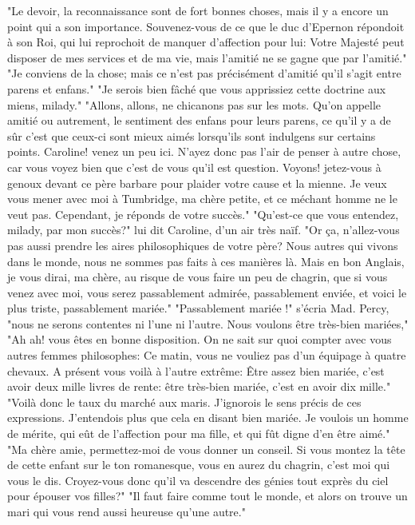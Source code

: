 "Le devoir, la reconnaissance sont de fort bonnes choses, mais il y a encore un\setcounter{page}{395} point qui a son importance. Souvenez-vous de ce que le duc d'Epernon répondoit à son Roi, qui lui reprochoit de manquer d'affection pour lui: Votre Majesté peut disposer de mes services et de ma vie, mais l'amitié ne se gagne que par l'amitié."
"Je conviens de la chose; mais ce n'est pas précisément d'amitié qu'il s'agit entre parens et enfans."
"Je serois bien fâché que vous apprissiez cette doctrine aux miens, milady."
"Allons, allons, ne chicanons pas sur les mots. Qu'on appelle amitié ou autrement, le sentiment des enfans pour leurs parens, ce qu'il y a de sûr c'est que ceux-ci sont mieux aimés lorsqu'ils sont indulgens sur certains points. Caroline! venez un peu ici. N'ayez donc pas l'air de penser à autre chose, car vous voyez bien que c'est de vous qu'il est question. Voyons! jetez-vous à genoux devant ce père barbare pour plaider votre cause et la mienne. Je veux vous mener avec moi à Tumbridge, ma chère petite, et ce méchant homme ne le veut pas. Cependant, je réponds de votre succès."
"Qu'est-ce que vous entendez, milady, par mon succès?" lui dit Caroline, d'un air très naïf.
"Or ça, n'allez-vous pas aussi prendre les\setcounter{page}{396} aires philosophiques de votre père? Nous autres qui vivons dans le monde, nous ne sommes pas faits à ces manières là. Mais en bon Anglais, je vous dirai, ma chère, au risque de vous faire un peu de chagrin, que si vous venez avec moi, vous serez passablement admirée, passablement enviée, et voici le plus triste, passablement mariée."
"Passablement mariée !" s'écria Mad. Percy, "nous ne serons contentes ni l'une ni l'autre. Nous voulons être très-bien mariées,"
"Ah ah! vous êtes en bonne disposition. On ne sait sur quoi compter avec vous autres femmes philosophes: Ce matin, vous ne vouliez pas d'un équipage à quatre chevaux. A présent vous voilà à l'autre extrême: Être assez bien mariée, c'est avoir deux mille livres de rente: être très-bien mariée, c'est en avoir dix mille."
"Voilà donc le taux du marché aux maris. J'ignorois le sens précis de ces expressions. J'entendois plus que cela en disant bien mariée. Je voulois un homme de mérite, qui eût de l'affection pour ma fille, et qui fût digne d'en être aimé."
"Ma chère amie, permettez-moi de vous donner un conseil. Si vous montez la tête de cette enfant sur le ton romanesque, vous en aurez du chagrin, c'est moi qui vous le\setcounter{page}{397} dis. Croyez-vous donc qu'il va descendre des génies tout exprès du ciel pour épouser vos filles?"
"Il faut faire comme tout le monde, et alors on trouve un mari qui vous rend aussi heureuse qu'une autre."
